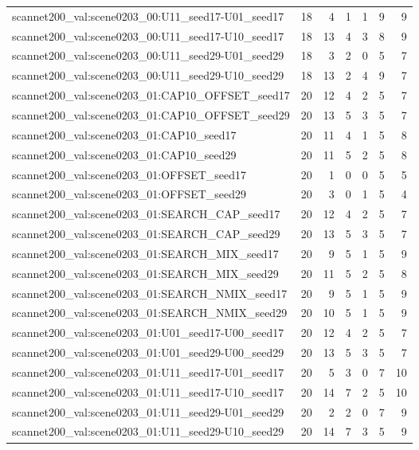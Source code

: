 \begin{table}[t]
\begin{tabular}{lrrrrrr}
scannet200\_val:scene0203\_00:U11\_seed17-U01\_seed17 & 18 & 4 & 1 & 1 & 9 & 9 \\
scannet200\_val:scene0203\_00:U11\_seed17-U10\_seed17 & 18 & 13 & 4 & 3 & 8 & 9 \\
scannet200\_val:scene0203\_00:U11\_seed29-U01\_seed29 & 18 & 3 & 2 & 0 & 5 & 7 \\
scannet200\_val:scene0203\_00:U11\_seed29-U10\_seed29 & 18 & 13 & 2 & 4 & 9 & 7 \\
scannet200\_val:scene0203\_01:CAP10\_OFFSET\_seed17 & 20 & 12 & 4 & 2 & 5 & 7 \\
scannet200\_val:scene0203\_01:CAP10\_OFFSET\_seed29 & 20 & 13 & 5 & 3 & 5 & 7 \\
scannet200\_val:scene0203\_01:CAP10\_seed17 & 20 & 11 & 4 & 1 & 5 & 8 \\
scannet200\_val:scene0203\_01:CAP10\_seed29 & 20 & 11 & 5 & 2 & 5 & 8 \\
scannet200\_val:scene0203\_01:OFFSET\_seed17 & 20 & 1 & 0 & 0 & 5 & 5 \\
scannet200\_val:scene0203\_01:OFFSET\_seed29 & 20 & 3 & 0 & 1 & 5 & 4 \\
scannet200\_val:scene0203\_01:SEARCH\_CAP\_seed17 & 20 & 12 & 4 & 2 & 5 & 7 \\
scannet200\_val:scene0203\_01:SEARCH\_CAP\_seed29 & 20 & 13 & 5 & 3 & 5 & 7 \\
scannet200\_val:scene0203\_01:SEARCH\_MIX\_seed17 & 20 & 9 & 5 & 1 & 5 & 9 \\
scannet200\_val:scene0203\_01:SEARCH\_MIX\_seed29 & 20 & 11 & 5 & 2 & 5 & 8 \\
scannet200\_val:scene0203\_01:SEARCH\_NMIX\_seed17 & 20 & 9 & 5 & 1 & 5 & 9 \\
scannet200\_val:scene0203\_01:SEARCH\_NMIX\_seed29 & 20 & 10 & 5 & 1 & 5 & 9 \\
scannet200\_val:scene0203\_01:U01\_seed17-U00\_seed17 & 20 & 12 & 4 & 2 & 5 & 7 \\
scannet200\_val:scene0203\_01:U01\_seed29-U00\_seed29 & 20 & 13 & 5 & 3 & 5 & 7 \\
scannet200\_val:scene0203\_01:U11\_seed17-U01\_seed17 & 20 & 5 & 3 & 0 & 7 & 10 \\
scannet200\_val:scene0203\_01:U11\_seed17-U10\_seed17 & 20 & 14 & 7 & 2 & 5 & 10 \\
scannet200\_val:scene0203\_01:U11\_seed29-U01\_seed29 & 20 & 2 & 2 & 0 & 7 & 9 \\
scannet200\_val:scene0203\_01:U11\_seed29-U10\_seed29 & 20 & 14 & 7 & 3 & 5 & 9 \\

\end{tabular}
\end{table}
